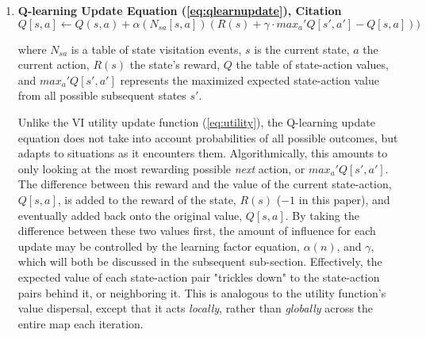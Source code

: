 \documentclass[12pt, letter]{article}
\begin{document}
\begin{enumerate}[rightmargin=.1\linewidth-\leftmargin\relax]
    \item \textbf{Q-learning Update Equation (\ref{eq:qlearnupdate}), Citation \cite{textbook}}\\
    \begin{equation} \label{eq:qlearnupdate}
        Q\left [ s,a \right ]\leftarrow Q\left ( s,a \right )+\alpha (N_{sa}[s,a])(R(s)+\gamma \cdot max_a' Q\left [ s',a' \right ]-Q\left [ s,a \right ]))
        \end{equation}
        \begin{small} \begin{changemargin}{1cm}{1cm}
        where  $N_{sa}$ is a table of state visitation events, $s$ is the current state, $a$ the current action, $R(s)$ the state's reward, $Q$ the table of state-action values, and $max_a' Q\left [ s',a' \right ]$ represents the maximized expected state-action value from all possible subsequent states $s'$.
        \end{changemargin} \end{small}
        
    Unlike the VI utility update function (\ref{eq:utility}), the Q-learning update equation does not take into account probabilities of all possible outcomes, but adapts to situations as it encounters them.  Algorithmically, this amounts to only looking at the most rewarding possible \emph{next} action, or $max_a' Q\left [ s',a' \right ]$.  The difference between this reward and the value of the current state-action, $Q\left [ s,a \right ]$, is added to the reward of the state, $R(s)$ ($-1$ in this paper), and eventually added back onto the original value, $Q\left [ s,a \right ]$.  By taking the difference between these two values first, the amount of influence for each update may be controlled by the learning factor equation, $\alpha (n)$, and $\gamma$, which will both be discussed in the subsequent sub-section.  Effectively, the expected value of each state-action pair "trickles down" to the state-action pairs behind it, or neighboring it.  This is analogous to the utility function's value dispersal, except that it acts \emph{locally}, rather than \emph{globally} across the entire map each iteration.
    
\end{enumerate}
\end{document}

